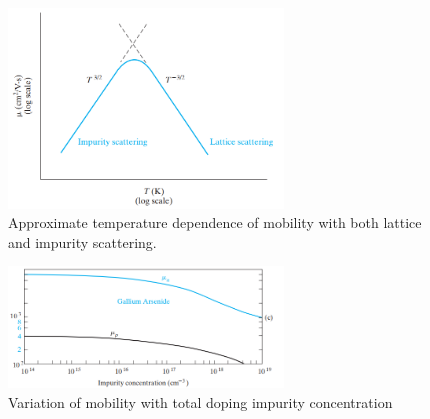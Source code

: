 \documentclass[12pt,a4paper]{article}
\begin{document}
\begin{large}
{\begin{itemize}
\begin{figure}[H] 
	\centering
	\includegraphics[width = 0.65\textwidth]{scattering}
	\caption{Approximate temperature dependence of mobility with both lattice and impurity scattering.}
	\label{fig:scattering}
\end{figure}


\begin{figure}[H] 
	\centering
	\includegraphics[width = 0.65\textwidth]{mobility temp}
	\caption{Variation of mobility with total doping impurity concentration}
	\label{fig:mobility temp}
\end{figure}


\end{itemize}
}


\end{large}
\end{document}

